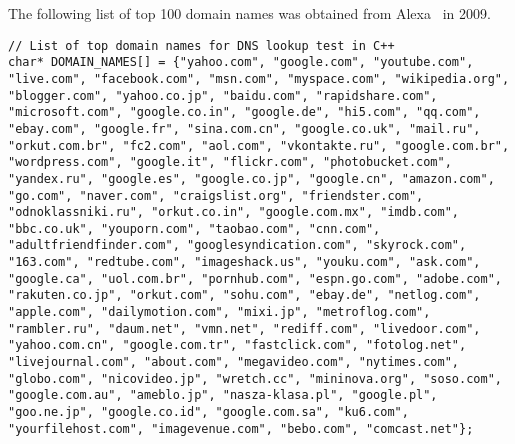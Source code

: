 \startappendices
{}
\label{app:dns}

The following list of top 100 domain names was obtained from Alexa~\cite{alexa} in 2009.

\lstset{language=C++}
\begin{lstlisting}
// List of top domain names for DNS lookup test in C++
char* DOMAIN_NAMES[] = {"yahoo.com", "google.com", "youtube.com", "live.com", "facebook.com", "msn.com", "myspace.com", "wikipedia.org", "blogger.com", "yahoo.co.jp", "baidu.com", "rapidshare.com", "microsoft.com", "google.co.in", "google.de", "hi5.com", "qq.com", "ebay.com", "google.fr", "sina.com.cn", "google.co.uk", "mail.ru", "orkut.com.br", "fc2.com", "aol.com", "vkontakte.ru", "google.com.br", "wordpress.com", "google.it", "flickr.com", "photobucket.com", "yandex.ru", "google.es", "google.co.jp", "google.cn", "amazon.com", "go.com", "naver.com", "craigslist.org", "friendster.com", "odnoklassniki.ru", "orkut.co.in", "google.com.mx", "imdb.com", "bbc.co.uk", "youporn.com", "taobao.com", "cnn.com", "adultfriendfinder.com", "googlesyndication.com", "skyrock.com", "163.com", "redtube.com", "imageshack.us", "youku.com", "ask.com", "google.ca", "uol.com.br", "pornhub.com", "espn.go.com", "adobe.com", "rakuten.co.jp", "orkut.com", "sohu.com", "ebay.de", "netlog.com", "apple.com", "dailymotion.com", "mixi.jp", "metroflog.com", "rambler.ru", "daum.net", "vmn.net", "rediff.com", "livedoor.com", "yahoo.com.cn", "google.com.tr", "fastclick.com", "fotolog.net", "livejournal.com", "about.com", "megavideo.com", "nytimes.com", "globo.com", "nicovideo.jp", "wretch.cc", "mininova.org", "soso.com", "google.com.au", "ameblo.jp", "nasza-klasa.pl", "google.pl", "goo.ne.jp", "google.co.id", "google.com.sa", "ku6.com", "yourfilehost.com", "imagevenue.com", "bebo.com", "comcast.net"};
\end{lstlisting}
